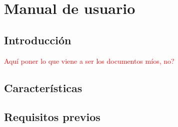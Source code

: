 \chapter{Manual de usuario}
\section{Introducción}
\textcolor{red}{Aquí poner lo que viene a ser los documentos míos, no?}

\section{Características}



\section{Requisitos previos}
